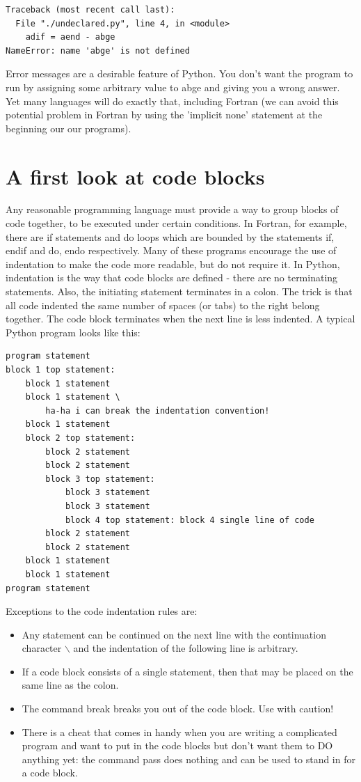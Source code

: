 \documentclass[11pt]{book}
\begin{document}
{{ \color{blue} \begin{verbatim}
Traceback (most recent call last):
  File "./undeclared.py", line 4, in <module>
    adif = aend - abge
NameError: name 'abge' is not defined
\end{verbatim}}

\noindent
Error messages are a desirable feature of Python.  You don't want the program
to run by assigning some arbitrary value to abge and giving you
a wrong answer.  Yet many languages will do exactly that, including
Fortran (we can avoid this potential problem in Fortran by using the 
'implicit none' statement at the beginning our our programs).


\section{A first look at code blocks}
Any reasonable programming language must provide a way to group blocks of code together, to be executed under certain conditions.  In Fortran, for example, there are if statements and do loops which are bounded by the statements if, endif and do, endo respectively.  Many of these programs encourage the use of indentation to make the code more readable, but do not require it.  In Python, indentation is the way that code blocks are defined - there are no terminating statements. Also, the initiating statement terminates in a colon.  The trick is that all code indented the same number of spaces (or tabs) to the right belong together.  The code block terminates when the next line is less indented.     A typical Python program looks like this: 

{ \color{blue}\begin {verbatim}
program statement
block 1 top statement:
    block 1 statement
    block 1 statement \
        ha-ha i can break the indentation convention!
    block 1 statement
    block 2 top statement:
        block 2 statement
        block 2 statement
        block 3 top statement:
            block 3 statement
            block 3 statement
            block 4 top statement: block 4 single line of code
        block 2 statement
        block 2 statement
    block 1 statement
    block 1 statement
program statement
\end{verbatim}}


\noindent Exceptions to the code indentation rules are:
\begin{itemize}
\item  Any statement can be continued on the next line with the continuation character $\backslash$ and the indentation of the following line is arbitrary.  \item If a code block consists of a single statement, then that may be placed on the same line as the colon. 
\item The command {\color{blue}break} breaks you out of the code block. Use with caution!
\item There is a cheat that comes in handy when you are writing a complicated program and want to put in the code blocks but don't want them to DO anything yet:  the command  {\color{blue} pass} does nothing and can be used to stand in for a code block.
\end{itemize}

}
\end{document}
